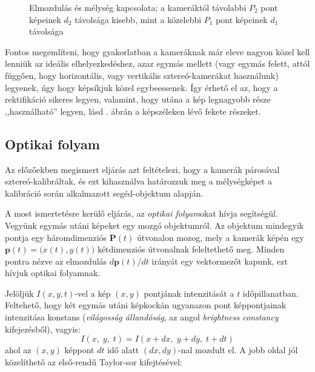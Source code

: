 \begin{figure}[tbh]
  \caption{Elmozdulás és mélység kapcsolata; a kameráktól távolabbi $P_2$ pont képeinek $d_2$ távolsága kisebb, mint a közelebbi $P_1$ pont képeinek $d_1$ távolsága \label{fig:depth-showcase}}
\end{figure}

Fontos megemlíteni, hogy gyakorlatban a kameráknak már eleve nagyon közel kell lenniük az ideális elhelyezkedéshez, azaz egymás mellett (vagy egymás felett, attól függően, hogy horizontális, vagy vertikális sztereó-kamerákat használunk) legyenek, úgy hogy képsíkjuk közel egybeessenek. Így érhető el az, hogy a rektifikáció sikeres legyen, valamint, hogy utána a kép legnagyobb része ,,használható'' legyen, lásd . ábrán a képszéleken lévő fekete részeket.

\subsection{Optikai folyam \label{methods:optic}}

Az előzőekben megismert eljárás azt feltételezi, hogy a kamerák párosával sztereó-kalib\-ráltak, és ezt kihasználva határozzuk meg a mélységképet a kalibráció során alkalmazott segéd-objek\-tum alapján.

A most ismertetésre kerülő eljárás, az \textit{optikai folyam}okat \cite{optic-flow} hívja segítségül. Vegyünk egymás utáni képeket egy mozgó objektumról. Az objektum mindegyik pontja egy háromdimenziós $\mathbf{P}(t)$ útvonalon mozog, mely a kamerák képén egy $\mathbf{p}(t) = \big(x(t), y(t)\big)$ kétdimenziós útvonalnak feleltethető meg. Minden pontra nézve az elmozdulás $d\mathbf{p}(t) / dt$ irányát egy vektormezőt kapunk, ezt hívjuk optikai folyamnak.

Jelöljük $I(x, y, t)$-vel a kép $(x, y)$ pontjának intenzitását a $t$ időpillanatban. Feltehető, hogy két egymás utáni képkockán ugyanazon pont képpontjainak intenzitása konstans (\textit{világosság állandóság}, az angol \textit{brightness constancy} kifejezésből), vagyis:
\[I(x,\; y,\; t) = I(x+dx,\; y+dy,\; t+dt)\]
ahol az $(x,y)$ képpont $dt$ idő alatt $(dx,dy)$-nal mozdult el. A jobb oldal jól közelíthető az első-rendű Taylor-sor kifejtésével:

